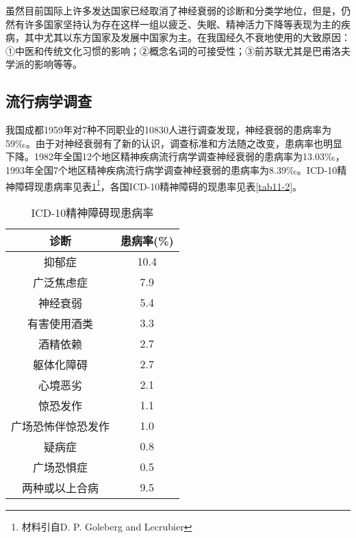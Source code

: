 虽然目前国际上许多发达国家已经取消了神经衰弱的诊断和分类学地位，但是，仍然有许多国家坚持认为存在这样一组以疲乏、失眠、精神活力下降等表现为主的疾病，其中尤其以东方国家及发展中国家为主。在我国经久不衰地使用的大致原因：①中医和传统文化习惯的影响；②概念名词的可接受性；③前苏联尤其是巴甫洛夫学派的影响等等。

\subsection{流行病学调查}

我国成都1959年对7种不同职业的10830人进行调查发现，神经衰弱的患病率为59‰。由于对神经衰弱有了新的认识，调查标准和方法随之改变，患病率也明显下降。1982年全国12个地区精神疾病流行病学调查神经衰弱的患病率为13.03‰，1993年全国7个地区精神疾病流行病学调查神经衰弱的患病率为8.39‰。ICD-10精神障碍现患病率见表\ref{tab11-1}\footnote{材料引自D. P. Goleberg and Lecrubier}，各国ICD-10精神障碍的现患率见表\ref{tab11-2}。

\begin{table}
\centering
\caption{ICD-10精神障碍现患病率}
\label{tab11-1}
\begin{tabular}{cc}
\toprule
诊断 & 患病率(\%) \\
\midrule
抑郁症 & 10.4\\
广泛焦虑症 & 7.9\\
神经衰弱 & 5.4\\
有害使用酒类 & 3.3\\
酒精依赖 & 2.7 \\
躯体化障碍& 2.7 \\
心境恶劣 & 2.1 \\
惊恐发作 & 1.1 \\
广场恐怖伴惊恐发作 & 1.0 \\
疑病症 & 0.8 \\
广场恐惧症 & 0.5\\
两种或以上合病 & 9.5\\
\bottomrule
\end{tabular}
\end{table}

